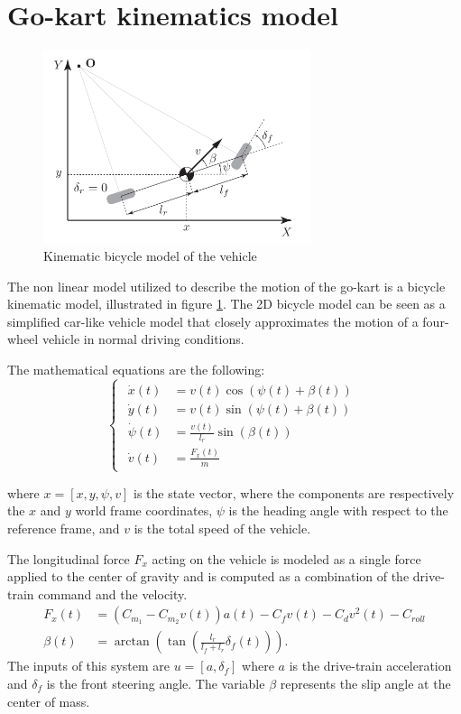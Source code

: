\documentclass[a4paper,12pt,oneside]{book}
\begin{document}
\section{Go-kart kinematics model}
\begin{figure}[h!]
	\centering
	\includegraphics[width=0.7\textwidth]{Bycicle_scheme.png}
\caption{Kinematic bicycle model of the vehicle}
\label{Kinematic_bicycle}
\end{figure}
The non linear model utilized to describe the motion of the go-kart is a bicycle kinematic model, illustrated in figure \ref{Kinematic_bicycle}.
The 2D bicycle model can be seen as a simplified car-like vehicle model that closely approximates the motion of a four-wheel vehicle in normal driving conditions.

The mathematical equations are the following:
\begin{equation}
\begin{cases}
 	\begin{aligned}
		\dot{x}(t) &= v(t) \cos(\psi(t) + \beta(t)) \\
		\dot{y}(t) &= v(t) \sin(\psi(t) + \beta(t)) \\
		\dot{\psi}(t) &= \frac{v(t)}{l_r} \sin(\beta(t)) \\
		\dot{v}(t) &= \frac{F_x(t)}{m} 
	\end{aligned}
\end{cases}
\label{Plant}
\end{equation}

where $x = [x, y, \psi, v]$ is the state vector, where the components are respectively the $x$ and $y$ world frame coordinates, $\psi$ is the heading angle with respect to the reference frame, and $v$ is the total speed of the vehicle.

The longitudinal force $F_x$ acting on the vehicle is modeled as a single force applied to the center of gravity and is computed as a combination of the drive-train command and the velocity. 
\begin{align}
    F_x (t) &= (C_{m_1} - C_{m_2} v(t)) a(t) - C_f v(t) - C_d v^2(t) - C_{roll} \label{eq:Long_force}\\
    \beta(t) &= \arctan\left(\tan\left(\frac{l_r}{l_f+l_r}\delta_f(t)\right) \right).
\end{align}
The inputs of this system are $u = [a, \delta_f]$ where $a$ is the drive-train acceleration and $\delta_f$ is the front steering angle. 
The variable $\beta$ represents the slip angle at the center of mass. 
\end{document}
